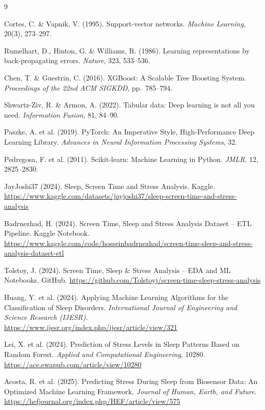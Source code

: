 \documentclass[12pt,a4paper]{article}
\begin{document}
\begin{thebibliography}{9}

Cortes, C. \& Vapnik, V. (1995).
Support-vector networks.
\textit{Machine Learning}, 20(3), 273--297.

Rumelhart, D., Hinton, G. \& Williams, R. (1986).
Learning representations by back-propagating errors.
\textit{Nature}, 323, 533--536.

Chen, T. \& Guestrin, C. (2016).
XGBoost: A Scalable Tree Boosting System.
\textit{Proceedings of the 22nd ACM SIGKDD}, pp.~785--794.

Shwartz-Ziv, R. \& Armon, A. (2022).
Tabular data: Deep learning is not all you need.
\textit{Information Fusion}, 81, 84--90.

Paszke, A. et al. (2019).
PyTorch: An Imperative Style, High-Performance Deep Learning Library.
\textit{Advances in Neural Information Processing Systems}, 32.

Pedregosa, F. et al. (2011).
Scikit-learn: Machine Learning in Python.
\textit{JMLR}, 12, 2825--2830.

JayJoshi37 (2024).
Sleep, Screen Time and Stress Analysis.
Kaggle. \url{https://www.kaggle.com/datasets/jayjoshi37/sleep-screen-time-and-stress-analysis}

Badrnezhad, H. (2024).
Screen Time, Sleep and Stress Analysis Dataset -- ETL Pipeline.
Kaggle Notebook. \url{https://www.kaggle.com/code/hosseinbadrnezhad/screen-time-sleep-and-stress-analysis-dataset-etl}

Tolstoy, J. (2024).
Screen Time, Sleep \& Stress Analysis -- EDA and ML Notebooks.
GitHub. \url{https://github.com/Tolstoyj/screen-time-sleep-stress-analysis}

Huang, Y. et al. (2024).
Applying Machine Learning Algorithms for the Classification of Sleep Disorders.
\textit{International Journal of Engineering and Science Research (IJESR)}.
\url{https://www.ijesr.org/index.php/ijesr/article/view/321}

Lei, X. et al. (2024).
Prediction of Stress Levels in Sleep Patterns Based on Random Forest.
\textit{Applied and Computational Engineering}, 10280.
\url{https://ace.ewapub.com/article/view/10280}

Acosta, R. et al. (2025).
Predicting Stress During Sleep from Biosensor Data: An Optimized Machine Learning Framework.
\textit{Journal of Human, Earth, and Future}.
\url{https://hefjournal.org/index.php/HEF/article/view/575}

\end{thebibliography}
\end{document}
